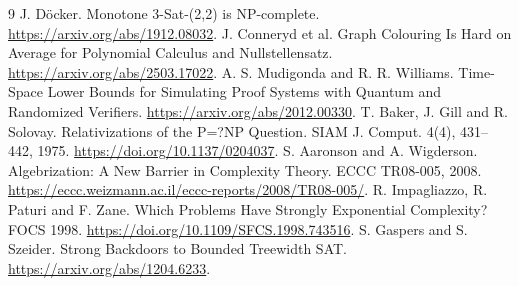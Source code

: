 \documentclass[11pt]{article}
\begin{document}
\begin{thebibliography}{9}
 J. D\"ocker. Monotone 3-Sat-(2,2) is NP-complete.
\url{https://arxiv.org/abs/1912.08032}.
 J. Conneryd et al. Graph Colouring Is Hard on Average for
Polynomial Calculus and Nullstellensatz. \url{https://arxiv.org/abs/2503.17022}.
 A. S. Mudigonda and R. R. Williams. Time-Space Lower Bounds for
Simulating Proof Systems with Quantum and Randomized Verifiers.
\url{https://arxiv.org/abs/2012.00330}.
 T. Baker, J. Gill and R. Solovay. Relativizations of the
P=?NP Question. SIAM J. Comput. 4(4), 431--442, 1975.
\url{https://doi.org/10.1137/0204037}.
 S. Aaronson and A. Wigderson. Algebrization: A New Barrier in
Complexity Theory. ECCC TR08-005, 2008.
\url{https://eccc.weizmann.ac.il/eccc-reports/2008/TR08-005/}.
 R. Impagliazzo, R. Paturi and F. Zane. Which Problems Have
Strongly Exponential Complexity? FOCS 1998.
\url{https://doi.org/10.1109/SFCS.1998.743516}.
 S. Gaspers and S. Szeider. Strong Backdoors to Bounded Treewidth
SAT. \url{https://arxiv.org/abs/1204.6233}.
\end{thebibliography}
\end{document}
